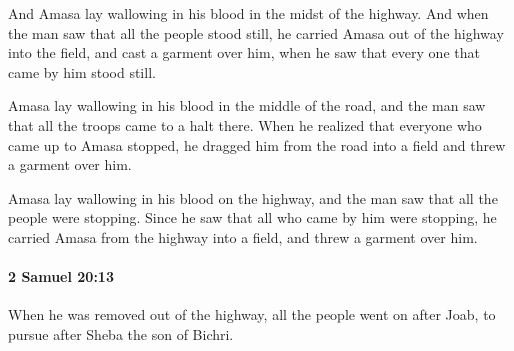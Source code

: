 			\begin{versebox}
					\item[BHS] 
					\item[ASV] And Amasa lay wallowing in his blood in the midst of the highway. And when the man saw that all the people stood still, he carried Amasa out of the highway into the field, and cast a garment over him, when he saw that every one that came by him stood still.
					\item[NIV] Amasa lay wallowing in his blood in the middle of the road, and the man saw that all the troops came to a halt there. When he realized that everyone who came up to Amasa stopped, he dragged him from the road into a field and threw a garment over him.
					\item[NRSV] Amasa lay wallowing in his blood on the highway, and the man saw that all the people were stopping. Since he saw that all who came by him were stopping, he carried Amasa from the highway into a field, and threw a garment over him.
			\end{versebox}

		\paragraph{2 Samuel 20:13} %
			\label{2SAMUEL-20-13}

			When he was removed out of the highway, all the people went on after Joab, to pursue after Sheba the son of Bichri.

